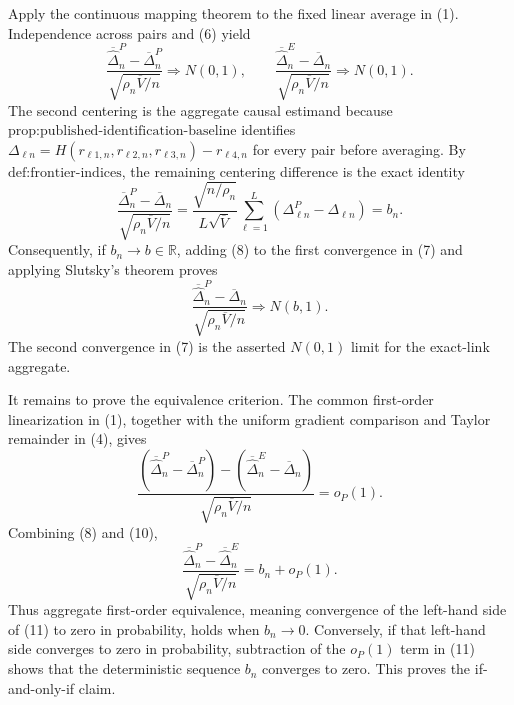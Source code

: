 Apply the continuous mapping theorem to the fixed linear average in (1).
Independence across pairs and (6) yield
\[
 \frac{\overline{\widehat\Delta}^{P}_{n}-\overline\Delta^{P}_{n}}
      {\sqrt{\rho_n\overline V/n}}
 \Rightarrow N(0,1),
 \qquad
 \frac{\overline{\widehat\Delta}^{E}_{n}-\overline\Delta_n}
      {\sqrt{\rho_n\overline V/n}}
 \Rightarrow N(0,1).
 \tag{7}
\]
The second centering is the aggregate causal estimand because
\(\text{prop:published-identification-baseline}\) identifies
\(\Delta_{\ell n}=H(r_{\ell1,n},r_{\ell2,n},r_{\ell3,n})-r_{\ell4,n}\)
for every pair before averaging.  By \(\text{def:frontier-indices}\), the
remaining centering difference is the exact identity
\[
 \frac{\overline\Delta^{P}_{n}-\overline\Delta_n}
      {\sqrt{\rho_n\overline V/n}}
 =\frac{\sqrt{n/\rho_n}}{L\sqrt{\overline V}}
    \sum_{\ell=1}^{L}(\Delta^{P}_{\ell n}-\Delta_{\ell n})
 =b_n.
 \tag{8}
\]
Consequently, if \(b_n\to b\in\mathbb R\), adding (8) to the first convergence
in (7) and applying Slutsky's theorem proves
\[
 \frac{\overline{\widehat\Delta}^{P}_{n}-\overline\Delta_n}
      {\sqrt{\rho_n\overline V/n}}
 \Rightarrow N(b,1).
 \tag{9}
\]
The second convergence in (7) is the asserted \(N(0,1)\) limit for the
exact-link aggregate.

It remains to prove the equivalence criterion.  The common first-order
linearization in (1), together with the uniform gradient comparison and
Taylor remainder in (4), gives
\[
 \frac{
   (\overline{\widehat\Delta}^{P}_{n}-\overline\Delta^{P}_{n})
   -(\overline{\widehat\Delta}^{E}_{n}-\overline\Delta_n)}
      {\sqrt{\rho_n\overline V/n}}
 =o_P(1).
 \tag{10}
\]
Combining (8) and (10),
\[
 \frac{\overline{\widehat\Delta}^{P}_{n}
       -\overline{\widehat\Delta}^{E}_{n}}
      {\sqrt{\rho_n\overline V/n}}
 =b_n+o_P(1).
 \tag{11}
\]
Thus aggregate first-order equivalence, meaning convergence of the left-hand
side of (11) to zero in probability, holds when \(b_n\to0\).  Conversely, if
that left-hand side converges to zero in probability, subtraction of the
\(o_P(1)\) term in (11) shows that the deterministic sequence \(b_n\) converges
to zero.  This proves the if-and-only-if claim.

